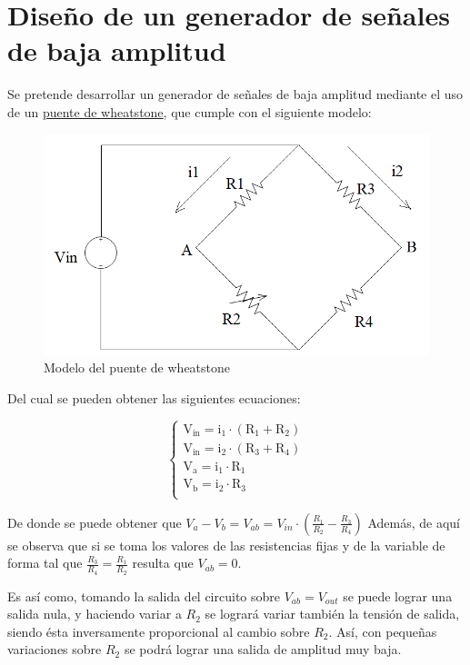 \documentclass[../../tc_tp3_main.tex]{subfiles}
\begin{document}
\section{Diseño de un generador de señales de baja amplitud}
Se pretende desarrollar un generador de señales de baja amplitud mediante el uso de un \underline{puente de wheatstone}, que cumple con el siguiente modelo:

	\begin{figure}[H]	
		\centering
		\includegraphics[scale=0.8]{imagenes/puente_wheatstone.png}
		\caption{Modelo del puente de wheatstone}
		\label{fig:ej5_puente_wheatstone}
	\end{figure}

Del cual se pueden obtener las siguientes ecuaciones: 

 	\begin{equation}
  	   \left\{
	  	    \begin{array}{ll}
		 					\mathrm{V_{in} = i_1\cdot (R_1 + R_2) } \\
			 				\mathrm{V_{in} = i_2\cdot (R_3 + R_4) } \\
		 					\mathrm{V_{a} = i_1\cdot R_1 } \\
			 				\mathrm{V_{b} = i_2\cdot R_3 } \\
	     	 \end{array}
	     	\right.
 	\end{equation}

De donde se puede obtener que $V_{a} - V_{b} = V_{ab} = V_{in} \cdot (\frac{R_1}{R_2} - \frac{R_3}{R_4})$
Además, de aquí se observa que si se toma los valores de las resistencias fijas y de la variable de forma tal que $\frac{R_3}{R_4} = \frac{R_1}{R_2}$ resulta que  $V_{ab} = 0$. \par
Es así como, tomando la salida del circuito sobre $V_{ab} = V_{out}$ se puede lograr una salida nula, y haciendo variar a $R_2$ se logrará variar también la tensión de salida, siendo ésta inversamente proporcional al cambio sobre $R_2$. Así, con pequeñas variaciones sobre $R_2$ se podrá lograr una salida de amplitud muy baja. \par
\end{document}
